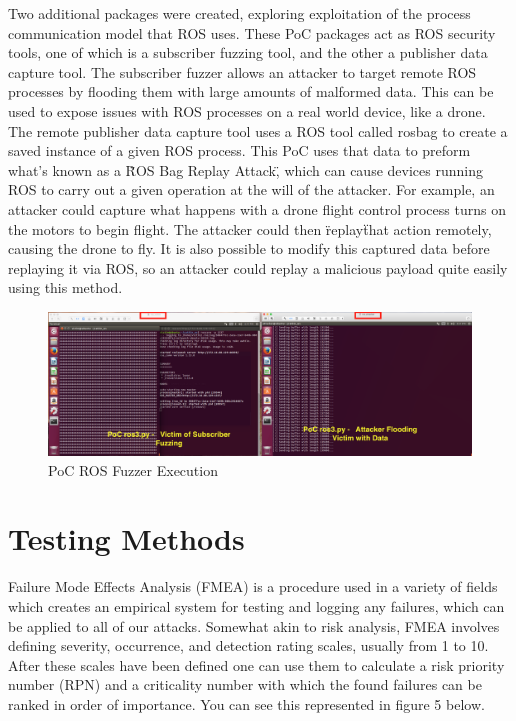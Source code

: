 \documentclass[IEEEtran,letterpaper,10pt,notitlepage,draftclsnofoot,onecolumn]{article}
\begin{document}
Two additional packages were created, exploring exploitation of the process communication model that ROS uses. These PoC packages act as ROS security tools, one of which is a subscriber
fuzzing tool, and the other a publisher data capture tool. The subscriber fuzzer allows an attacker to target remote ROS processes by flooding them with large amounts of malformed data.
This can be used to expose issues with ROS processes on a real world device, like a drone. The remote publisher data capture tool uses a ROS tool called rosbag to create a saved instance
of a given ROS process. This PoC uses that data to preform what's known as a \"ROS Bag Replay Attack\", which can cause devices running ROS to carry out a given operation at the will of the attacker.
For example, an attacker could capture what happens with a drone flight control process turns on the motors to begin flight. The attacker could then \"replay\" that action remotely, causing the drone
to fly. It is also possible to modify this captured data before replaying it via ROS, so an attacker could replay a malicious payload quite easily using this method.

\begin{figure}[H]
  \centering
    \includegraphics[width=\textwidth]{poc3}
    \caption{PoC ROS Fuzzer Execution}
\end{figure}

\section{Testing Methods}
Failure Mode Effects Analysis (FMEA) is a procedure used in a variety of fields which creates an empirical system for testing and logging any failures, which can be applied to all of our attacks. \cite{FMEA}
Somewhat akin to risk analysis, FMEA involves defining severity, occurrence, and detection rating scales, usually from 1 to 10.
After these scales have been defined one can use them to calculate a risk priority number (RPN) and a criticality number with which the found failures can be ranked in order of importance.
You can see this represented in figure 5 below.
\end{document}
